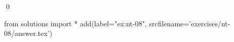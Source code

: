 
\begin{ex} 
  \label{ex:nt-08}
  
  \qed
\end{ex} 
\begin{python0}
from solutions import *
add(label="ex:nt-08",
    srcfilename='exercises/nt-08/answer.tex') 
\end{python0}
